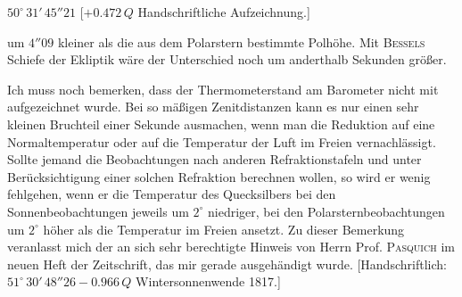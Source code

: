 \begin{center}\fontsize{10}{12}\selectfont $50^\circ\,31'\,45''21$ [$+0.472\,Q$ Handschriftliche Aufzeichnung.]\end{center}

\noindent um $4''09$ kleiner als die aus dem Polarstern bestimmte Polhöhe. Mit \textsc{Bessels} Schiefe der Ekliptik wäre der Unterschied noch um anderthalb Sekunden größer.

\par\indent Ich muss noch bemerken, dass der Thermometerstand am Barometer nicht mit aufgezeichnet wurde. Bei so mäßigen Zenitdistanzen kann es nur einen sehr kleinen Bruchteil einer Sekunde ausmachen, wenn man die Reduktion auf eine Normaltemperatur oder auf die Temperatur der Luft im Freien vernachlässigt. Sollte jemand die Beobachtungen nach anderen Refraktionstafeln und unter Berücksichtigung einer solchen Refraktion berechnen wollen, so wird er wenig fehlgehen, wenn er die Temperatur des Quecksilbers bei den Sonnenbeobachtungen jeweils um $2^\circ$ niedriger, bei den Polarsternbeobachtungen um $2^\circ$ höher als die Temperatur im Freien ansetzt. Zu dieser Bemerkung veranlasst mich der an sich sehr berechtigte Hinweis von Herrn Prof. \textsc{Pasquich} im neuen Heft der Zeitschrift, das mir gerade ausgehändigt wurde. [Handschriftlich: $51^\circ\,30'\,48''26 - 0.966\,Q$ Wintersonnenwende 1817.]
